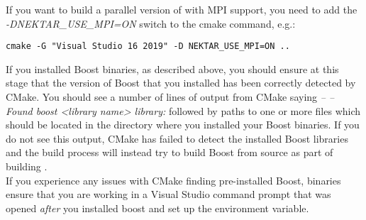 \begin{enumerate}
  If you want to build a parallel version of \nekpp with MPI support, you need
  to add the \emph{-DNEKTAR\_USE\_MPI=ON} switch to the cmake command, e.g.:
  \begin{lstlisting}[style=BashInputStyle]
    cmake -G "Visual Studio 16 2019" -D NEKTAR_USE_MPI=ON ..
  \end{lstlisting}

  \begin{notebox}
  If you installed Boost binaries, as described above, you should ensure at
  this stage that the version of Boost that you installed has been correctly 
  detected by CMake. You should see a number of lines of output from CMake
  saying \emph{-- -- Found boost <library name> library: } followed by paths to
  one or more files which should be located in the directory where you
  installed your Boost binaries. If you do not see this output, CMake has
  failed to detect the installed Boost libraries and the build process will
  instead try to build Boost from source as part of building \nekpp.\\
  
  If you experience any issues with CMake finding pre-installed Boost, binaries
  ensure that you are working in a Visual Studio command prompt that was
  opened \emph{after} you installed boost and set up the 
  environment variable.
  \end{notebox}
  

\end{enumerate}
